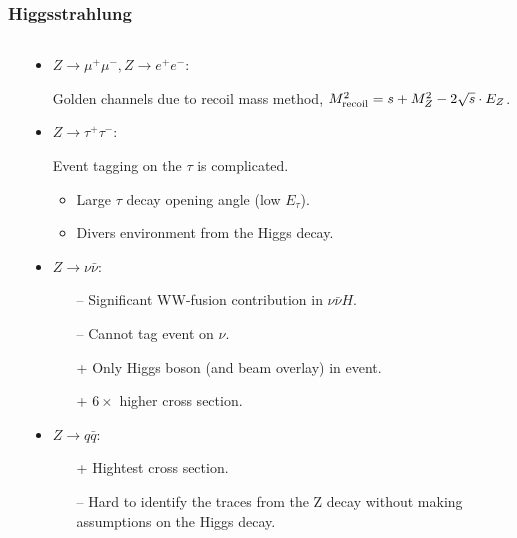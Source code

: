 \begin{frame}%
    \frametitle{Higgsstrahlung}
    \begin{columns}[c,onlytextwidth]
    \begin{column}{0.40\textwidth}
    \resizebox{\textwidth}{!}{\FeynmanHiggsstrahlung}
    \end{column}
    \begin{column}{0.60\textwidth}
    \vspace{-1\baselineskip} %
    \begin{itemize}
        \item \textcolor{xemphcolor}{
            $Z \rightarrow \mu^+ \mu^-, Z \rightarrow e^+ e^-$}:

            Golden channels due to recoil mass method,
            $M_{\textnormal{recoil}}^2 = s + M_Z^2 - 2\sqrt{s} \cdot E_Z$.
        \item \textcolor{xemphcolor}{
            $Z \rightarrow \tau^+ \tau^-$}:

            Event tagging on the $\tau$ is complicated.
            \begin{itemize}
                \item Large $\tau$ decay opening angle (low $E_\tau$).
                \item Divers environment from the Higgs decay.
            \end{itemize}
        \item \textcolor{xemphcolor}{
            $Z \rightarrow \nu\bar{\nu}$}:
            \begin{itemize}
                \item[--] Significant WW-fusion contribution in $\nu\bar{\nu}H$.
                \item[--] Cannot tag event on $\nu$.
                \item[+]  Only Higgs boson (and beam overlay) in event.
                \item[+]  $6\times$ higher cross section.
            \end{itemize}

        \item \textcolor{xemphcolor}{
            $Z \rightarrow q \bar{q}$}:
            \begin{itemize}
                \item[+]  Hightest cross section.
                \item[--] Hard to identify the traces from the Z decay
                    without making assumptions on the Higgs decay.
            \end{itemize}
    \end{itemize}
    \end{column}
    \end{columns}
    \end{frame}
